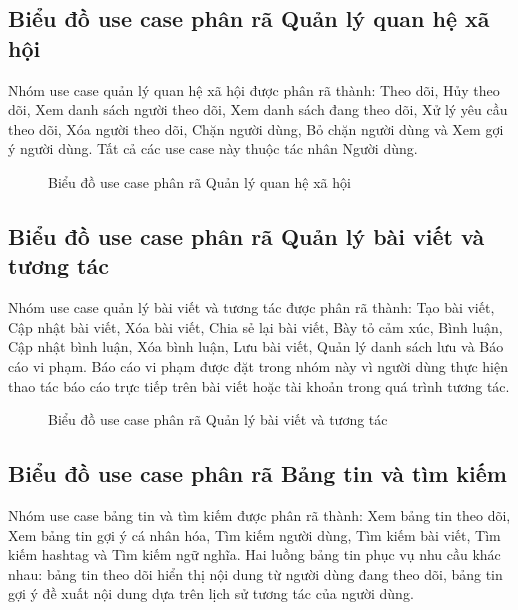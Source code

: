 \documentclass[../DoAn.tex]{subfiles}
\begin{document}
\subsection{Biểu đồ use case phân rã Quản lý quan hệ xã hội}
\label{subsection:2.2.3}
Nhóm use case quản lý quan hệ xã hội được phân rã thành: Theo dõi, Hủy theo dõi, Xem danh sách người theo dõi, Xem danh sách đang theo dõi, Xử lý yêu cầu theo dõi, Xóa người theo dõi, Chặn người dùng, Bỏ chặn người dùng và Xem gợi ý người dùng. Tất cả các use case này thuộc tác nhân Người dùng.

\begin{figure}[H]
\centering
{}
\caption{Biểu đồ use case phân rã Quản lý quan hệ xã hội}
\label{fig:use-case-relations}
\end{figure}

\subsection{Biểu đồ use case phân rã Quản lý bài viết và tương tác}
\label{subsection:2.2.4}
Nhóm use case quản lý bài viết và tương tác được phân rã thành: Tạo bài viết, Cập nhật bài viết, Xóa bài viết, Chia sẻ lại bài viết, Bày tỏ cảm xúc, Bình luận, Cập nhật bình luận, Xóa bình luận, Lưu bài viết, Quản lý danh sách lưu và Báo cáo vi phạm. Báo cáo vi phạm được đặt trong nhóm này vì người dùng thực hiện thao tác báo cáo trực tiếp trên bài viết hoặc tài khoản trong quá trình tương tác.

\begin{figure}[H]
\centering
{}
\caption{Biểu đồ use case phân rã Quản lý bài viết và tương tác}
\label{fig:use-case-posts}
\end{figure}

\subsection{Biểu đồ use case phân rã Bảng tin và tìm kiếm}
\label{subsection:2.2.5}
Nhóm use case bảng tin và tìm kiếm được phân rã thành: Xem bảng tin theo dõi, Xem bảng tin gợi ý cá nhân hóa, Tìm kiếm người dùng, Tìm kiếm bài viết, Tìm kiếm hashtag và Tìm kiếm ngữ nghĩa. Hai luồng bảng tin phục vụ nhu cầu khác nhau: bảng tin theo dõi hiển thị nội dung từ người dùng đang theo dõi, bảng tin gợi ý đề xuất nội dung dựa trên lịch sử tương tác của người dùng.
\end{document}
